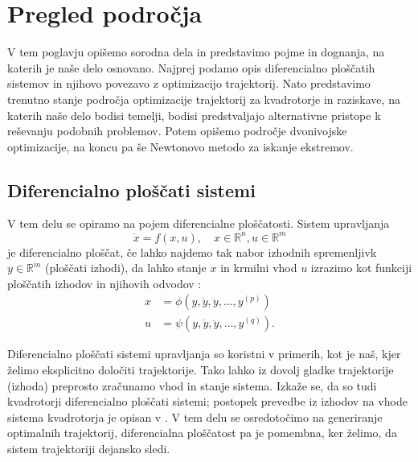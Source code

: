 \documentclass[mat2, tisk]{fmfdelo}
\begin{document}
\section{Pregled področja}
\label{sec:pregled_podrocja}

V tem poglavju opišemo sorodna dela in predstavimo pojme in dognanja, na katerih je naše delo osnovano. Najprej podamo opis diferencialno ploščatih sistemov in njihovo povezavo z optimizacijo trajektorij. Nato predstavimo trenutno stanje področja optimizacije trajektorij za kvadrotorje in raziskave, na katerih naše delo bodisi temelji, bodisi predstvaljajo alternativne pristope k reševanju podobnih problemov. Potem opišemo področje dvonivojske optimizacije, na koncu pa še Newtonovo metodo za iskanje ekstremov.

\subsection{Diferencialno ploščati sistemi}
V tem delu se opiramo na pojem diferencialne ploščatosti. Sistem upravljanja
\begin{equation}
    \dot{x} = f(x, u), \quad x \in \mathbb{R}^n, u \in \mathbb{R}^m
\end{equation}
je diferencialno ploščat, če lahko najdemo tak nabor izhodnih spremenljivk $y \in \mathbb{R}^m$ (ploščati izhodi), da lahko stanje $x$ in krmilni vhod $u$ izrazimo kot funkciji ploščatih izhodov in njihovih odvodov \cite{murray1995differential}:
\begin{align}
    x &= \phi(y, \dot{y}, \ddot{y}, \dots, y^{(p)}) \\
    u &= \psi(y, \dot{y}, \ddot{y}, \dots, y^{(q)}).
\end{align}

Diferencialno ploščati sistemi upravljanja so koristni v primerih, kot je naš, kjer želimo eksplicitno določiti trajektorije. Tako lahko iz dovolj gladke trajektorije (izhoda) preprosto zračunamo vhod in stanje sistema. Izkaže se, da so tudi kvadrotorji diferencialno ploščati sistemi; postopek prevedbe iz izhodov na vhode sistema kvadrotorja je opisan v \cite{mellinger2011minimum}. V tem delu se osredotočimo na generiranje optimalnih trajektorij, diferencialna ploščatost pa je pomembna, ker želimo, da sistem trajektoriji dejansko sledi.
\end{document}
